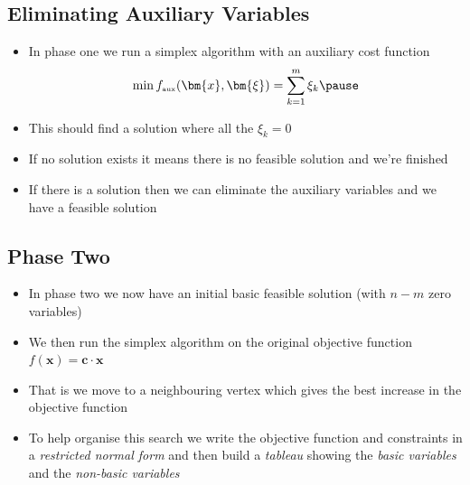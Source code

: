 
\begin{slide}
\section{Eliminating Auxiliary Variables}

\begin{PauseHighLight}
  \begin{itemize}
  \item In phase one we run a simplex algorithm with an auxiliary cost
    function
    \begin{align*}
      \min f_{\text{\tiny aux}}(\bm{x},\bm{\xi}) = \sum_{k=1}^m \xi_k \pause
    \end{align*}
  \item This should find a solution where all the $\xi_k=0$\pause
  \item If no solution exists it means there is no feasible solution and
    we're finished\pause
  \item If there is a solution then we can eliminate the auxiliary
    variables and we have a feasible solution\pause
  \end{itemize}
\end{PauseHighLight}

\end{slide}

\Outline %

\begin{slide}
\section{Phase Two}

\begin{PauseHighLight}
  \begin{itemize}
  \item In phase two we now have an initial basic feasible solution
    (with $n-m$ zero variables)\pause
  \item We then run the simplex algorithm on the original objective
    function $f(\bm{x}) = \bm{c} \cdot \bm{x}$\pause
  \item That is we move to a neighbouring vertex which gives the best
    increase in the objective function\pause
  \item To help organise this search we write the objective function and
    constraints in a \emph{restricted normal form} and then build a
    \emph{tableau} showing the \textit{basic variables} and the
    \textit{non-basic variables}\pause
  \end{itemize}
\end{PauseHighLight}

\end{slide}


